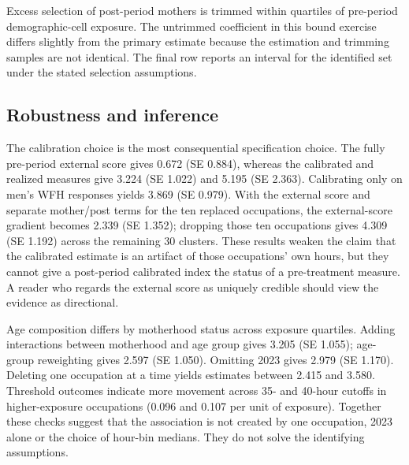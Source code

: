 \documentclass[12pt,a4paper]{article}
\begin{document}
\begin{table}[htbp]\centering\begin{threeparttable}
\caption{Selection bounds for the occupational-exposure DDD}\label{tab:lee}
\renewcommand{\baselinestretch}{1}\small

\begin{tablenotes}\footnotesize\item Excess selection of post-period mothers is trimmed within quartiles of pre-period demographic-cell exposure. The untrimmed coefficient in this bound exercise differs slightly from the primary estimate because the estimation and trimming samples are not identical. The final row reports an interval for the identified set under the stated selection assumptions.\end{tablenotes}
\end{threeparttable}\end{table}

\subsection{Robustness and inference}\label{sec:robust}
The calibration choice is the most consequential specification choice. The fully pre-period external score gives 0.672 (SE 0.884), whereas the calibrated and realized measures give 3.224 (SE 1.022) and 5.195 (SE 2.363). Calibrating only on men's WFH responses yields 3.869 (SE 0.979). With the external score and separate mother/post terms for the ten replaced occupations, the external-score gradient becomes 2.339 (SE 1.352); dropping those ten occupations gives 4.309 (SE 1.192) across the remaining 30 clusters. These results weaken the claim that the calibrated estimate is an artifact of those occupations' own hours, but they cannot give a post-period calibrated index the status of a pre-treatment measure. A reader who regards the external score as uniquely credible should view the evidence as directional.

Age composition differs by motherhood status across exposure quartiles. Adding interactions between motherhood and age group gives 3.205 (SE 1.055); age-group reweighting gives 2.597 (SE 1.050). Omitting 2023 gives 2.979 (SE 1.170). Deleting one occupation at a time yields estimates between 2.415 and 3.580. Threshold outcomes indicate more movement across 35- and 40-hour cutoffs in higher-exposure occupations (0.096 and 0.107 per unit of exposure). Together these checks suggest that the association is not created by one occupation, 2023 alone or the choice of hour-bin medians. They do not solve the identifying assumptions.
\end{document}
